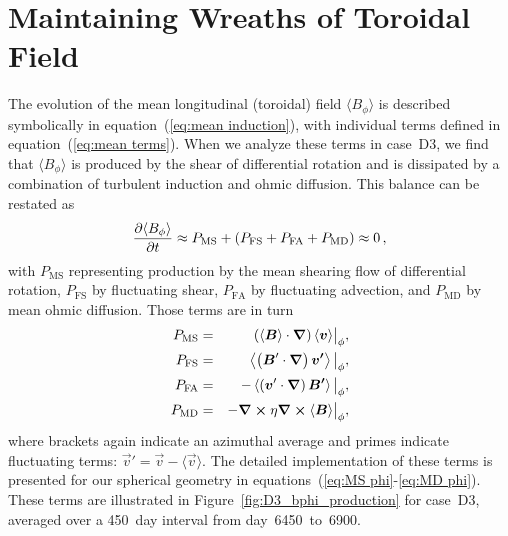 \section{Maintaining Wreaths of Toroidal Field}
The evolution of the mean longitudinal (toroidal) field $\langle B_\phi \rangle$
is described symbolically in equation~(\ref{eq:mean induction}), with
individual terms defined in equation~(\ref{eq:mean terms}).
When we analyze these terms in case~D3, we find that  $\langle
B_\phi \rangle$ is produced by the shear of differential rotation and
is dissipated by a combination of turbulent induction and ohmic
diffusion.  This balance can be restated as  
\begin{equation}
  \frac{\partial \langle B_\phi \rangle}{\partial t} \approx 
  P_\mathrm{MS} + \left(P_\mathrm{FS} + P_\mathrm{FA} + P_\mathrm{MD}\right)
  \approx 0\thinspace ,
\end{equation}
with $P_\mathrm{MS}$ representing production by the mean shearing flow of
differential rotation, 
$P_\mathrm{FS}$ by fluctuating shear, $P_\mathrm{FA}$ by fluctuating
advection, and $P_\mathrm{MD}$ by mean ohmic diffusion.
Those terms are in turn 
\begin{eqnarray}
  \label{eq:P_DR}
  P_\mathrm{MS} &=& \phn\left(\langle \vec{B} \rangle \cdot \vec{\del} \right) 
    \langle \vec{v} \rangle \big|_\phi, \\
  \label{eq:P_turb}
  P_\mathrm{FS} &=& \phn\left\langle \left(\vec{B}' \cdot \vec{\del} \right)  
    \vec{v'} \right\rangle\big|_\phi, \\
  P_\mathrm{FA} &=& - \left\langle \left(\vec{v}' \cdot \vec{\del} \right) 
    \vec{B'} \right\rangle\big|_\phi, \\
  \label{eq:P_diff}
  P_\mathrm{MD} &=& -\vec{\del} \cross \eta \vec{\del} \cross \langle
    \vec{B} \rangle \big|_\phi,
\end{eqnarray}
where brackets again indicate an azimuthal average and primes
indicate fluctuating terms: $\vec{v}' = \vec{v} - \langle \vec{v} \rangle$.
The detailed implementation of these terms  is presented for our
spherical geometry in equations~(\ref{eq:MS phi}-\ref{eq:MD phi}).
These terms are illustrated in Figure~\ref{fig:D3_bphi_production}
for case~D3, averaged over a 450~day interval from day~6450~to~6900.  

